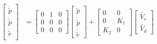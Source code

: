 \begin{align*}
\begin{bmatrix}
    \dot{\tilde{p}}\\
    \ddot{\tilde{p}}\\
    \ddot{\tilde{e}}\\
\end{bmatrix} &= 
\begin{bmatrix}
    0 & 1 & 0\\
    0 & 0 & 0\\
    0 & 0 & 0
\end{bmatrix}
\begin{bmatrix}
    \tilde{p}\\
    \dot{\tilde{p}}\\
    \dot{\tilde{e}}
\end{bmatrix} +
\begin{bmatrix}
    0 & 0\\
    0 & K_1\\
    K_2 & 0
\end{bmatrix}
\begin{bmatrix}
    \tilde{V_s}\\
    \tilde{V_d}
\end{bmatrix}
\end{align*}

\newpage
{}
